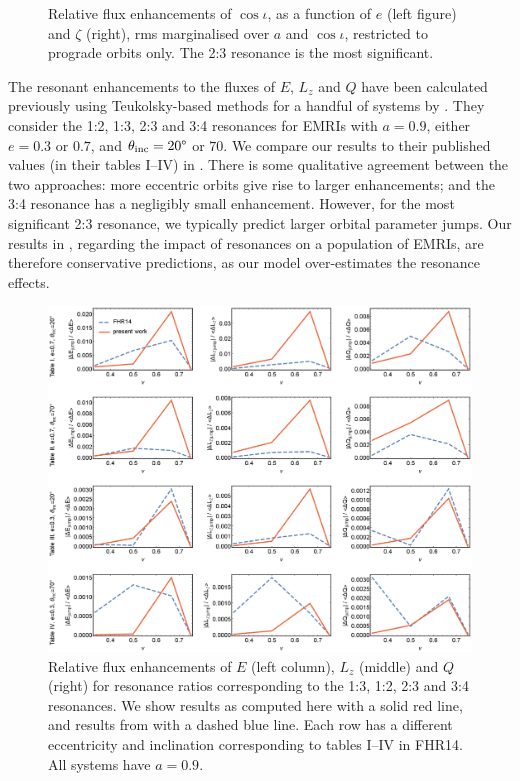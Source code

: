 \begin{figure}[htbp]
\centering
{}
\caption{\label{fig:res-flux-rms-cosi}Relative flux enhancements of $\cos\iota$, as a function of $e$ (left figure) and $\zeta$ (right), rms marginalised over $a$ and $\cos\iota$, restricted to prograde orbits only. The 2:3 resonance is the most significant.}
\end{figure}

The resonant enhancements to the fluxes of $E$, $L_z$ and $Q$ have been calculated previously using Teukolsky-based methods for a handful of systems by \citet{flanagan_resonantly_2014}. They consider the 1:2, 1:3, 2:3 and 3:4 resonances for EMRIs with $a=0.9$, either $e=0.3$ or $0.7$, and $\theta_\mathrm{inc} = 20\text{\textdegree}$ or $70$\textdegree. We compare our results to their published values (in their tables I--IV) in . There is some qualitative agreement between the two approaches: more eccentric orbits give rise to larger enhancements; and the 3:4 resonance has a negligibly small enhancement. However, for the most significant 2:3 resonance, we typically predict larger orbital parameter jumps. Our results in , regarding the impact of resonances on a population of EMRIs, are therefore conservative predictions, as our model over-estimates the resonance effects.

\begin{figure}[htbp]
\centering
\includegraphics[width=\textwidth]{res_flux_FHR}
\caption{\label{fig:res-flux-FHR}Relative flux enhancements of $E$ (left column), $L_z$ (middle) and $Q$ (right) for resonance ratios corresponding to the 1:3, 1:2, 2:3 and 3:4 resonances. We show results as computed here with a solid red line, and results from \citet[FHR14]{flanagan_resonantly_2014} with a dashed blue line. Each row has a different eccentricity and inclination corresponding to tables I--IV in FHR14. All systems have $a=0.9$.}
\end{figure}

